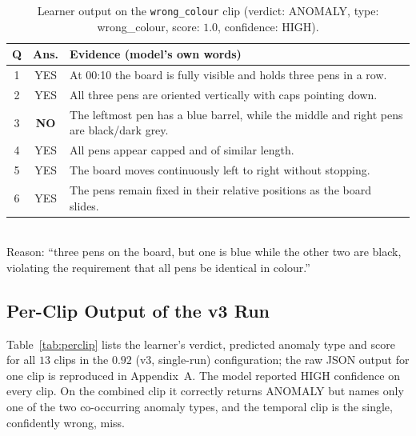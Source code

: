 \begin{table}[!htbp]
\centering
\caption{\label{tab:example}Learner output on the \texttt{wrong\_colour} clip (verdict:
ANOMALY, type: wrong\_colour, score: $1.0$, confidence: HIGH).}
\begin{tabular}{c|c|p{9cm}}
\hline
Q & Ans. & Evidence (model's own words) \\
\hline
1 & YES & At 00:10 the board is fully visible and holds three pens in a row. \\
2 & YES & All three pens are oriented vertically with caps pointing down. \\
3 & \textbf{NO} & The leftmost pen has a blue barrel, while the middle and right pens are black/dark grey. \\
4 & YES & All pens appear capped and of similar length. \\
5 & YES & The board moves continuously left to right without stopping. \\
6 & YES & The pens remain fixed in their relative positions as the board slides. \\
\hline
\end{tabular}
\\[3pt]
\footnotesize{Reason: ``three pens on the board, but one is blue while the other two are
black, violating the requirement that all pens be identical in colour.''}
\end{table}

\subsection{Per-Clip Output of the v3 Run}
Table~\ref{tab:perclip} lists the learner's verdict, predicted anomaly type and score for
all $13$ clips in the $0.92$ (v3, single-run) configuration; the raw JSON output for one
clip is reproduced in Appendix~A. The model reported HIGH confidence on every
clip. On the combined clip it correctly returns ANOMALY but names only one of the two
co-occurring anomaly types, and the temporal clip is the single, confidently wrong, miss.

